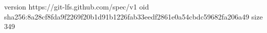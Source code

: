 version https://git-lfs.github.com/spec/v1
oid sha256:8a28cf8fda9f2269f20b1d91b1226fab33eedf2861e0a54cbdc59682fa206a49
size 349
